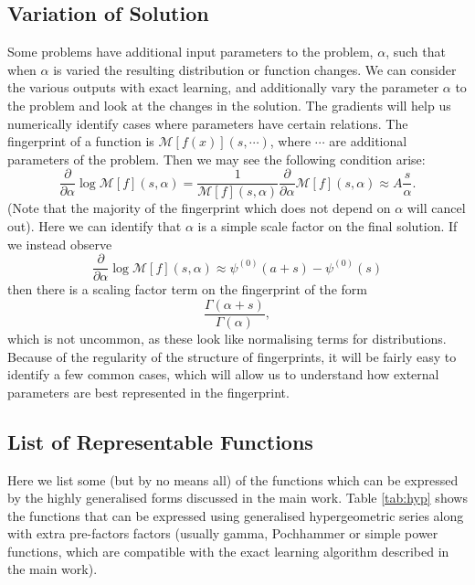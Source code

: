 \documentclass{article}
\begin{document}
\subsection{Variation of Solution} 
Some problems have additional input parameters to the problem, $\alpha$, such that when $\alpha$ is varied the resulting distribution or function changes. We can consider the various outputs with exact learning, and additionally vary the parameter $\alpha$ to the problem and look at the changes in the solution. The gradients will help us numerically identify cases where parameters have certain relations. The fingerprint of a function is $\mathcal{M}[f(x)](s,\cdots)$, where $\cdots$ are additional parameters of the problem. Then we may see the following condition arise:
\begin{equation}
\frac{\partial}{\partial \alpha} \log \mathcal{M}[f](s,\alpha) = \frac{1}{\mathcal{M}[f](s,\alpha)}\frac{\partial}{\partial \alpha} \mathcal{M}[f](s,\alpha) \approx A\frac{s}{\alpha}.
\end{equation}
(Note that the majority of the fingerprint which does not depend on $\alpha$ will cancel out). Here we can identify that $\alpha$ is a simple scale factor on the final solution. If we instead observe 
\begin{equation}
\frac{\partial}{\partial \alpha} \log \mathcal{M}[f](s,\alpha) \approx \psi^{(0)}(a+s) - \psi^{(0)}(s)
\end{equation}
then there is a scaling factor term on the fingerprint of the form
\begin{equation}
\frac{\Gamma(\alpha+s)}{\Gamma(\alpha)},
\end{equation}
which is not uncommon, as these look like normalising terms for distributions. Because of the regularity of the structure of fingerprints, it will be fairly easy to identify a few common cases, which will allow us to understand how external parameters are best represented in the fingerprint.

\subsection{List of Representable Functions}
Here we list some (but by no means all) of the functions which can be expressed by the highly generalised forms discussed in the main work. Table \ref{tab:hyp} shows the functions that can be expressed using generalised hypergeometric series along with extra pre-factors factors (usually gamma, Pochhammer or simple power functions, which are compatible with the exact learning algorithm described in the main work).
\end{document}
